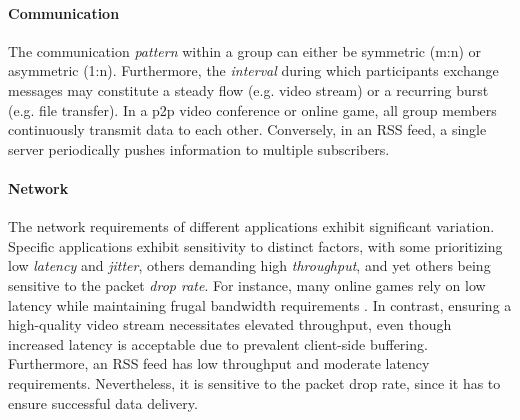\paragraph{Communication} %
\label{par:Communication}
The communication \textit{pattern} within a group can either be symmetric
    (m:n) or asymmetric (1:n).
Furthermore, the \textit{interval} during which participants exchange messages
    may constitute a steady flow (e.g. video stream) or a recurring burst (e.g.
    file transfer).
In a \gls{p2p} video conference or online game, all group members continuously
    transmit data to each other.
Conversely, in an RSS feed, a single server periodically pushes information to
    multiple subscribers.

\paragraph{Network} %
\label{par:Network}
The network requirements of different applications exhibit significant
    variation.
Specific applications exhibit sensitivity to distinct factors, with some
    prioritizing low \textit{latency} and \textit{jitter}, others demanding
    high \textit{throughput}, and yet others being sensitive to the packet
    \textit{drop rate}.
For instance, many online games rely on low latency while maintaining frugal
    bandwidth requirements \cite{games_net_req}.
In contrast, ensuring a high-quality video stream necessitates elevated
    throughput, even though increased latency is acceptable due to prevalent
    client-side buffering.
Furthermore, an RSS feed has low throughput and moderate latency requirements.
Nevertheless, it is sensitive to the packet drop rate, since it has to ensure
    successful data delivery.


